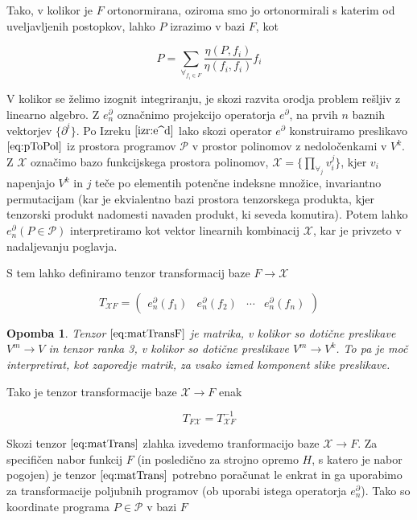 \documentclass{article}
\newcommand{\X}{\mathcal{X}}
\newcommand{\dP}{\mathcal{P}}
\newcommand{\D}{\partial}
\newtheorem{opomba}{Opomba}[section]
\begin{document}
  Tako, v kolikor je $F$ ortonormirana, oziroma smo jo ortonormirali s katerim od uveljavljenih postopkov, lahko $P$ izrazimo v bazi $F$, kot
  
  \begin{equation}
 	P=\sum\limits_{\forall_{f_i\in F}}\frac{\eta(P,f_i)}{\eta(f_i,f_i)}f_i
  \end{equation}
  
  V kolikor se želimo izognit integriranju, je skozi razvita orodja problem rešljiv z linearno algebro. Z $e_n^\D$ označnimo projekcijo operatorja $e^\D$, na prvih $n$ baznih vektorjev $\{\D^i\}$. Po Izreku $\ref{izr:e^d}$ lako skozi operator $e^\D$ konstruiramo preslikavo $\eqref{eq:pToPol}$ iz prostora programov $\dP$ v prostor polinomov z nedoločenkami v  $V^k$. Z $\X$ označimo bazo funkcijskega prostora polinomov, $\X=\{\prod\limits_{\forall_j} v_i^j\}$, kjer $v_i$ napenjajo $V^k$ in $j$ teče po elementih potenčne indeksne množice, invariantno permutacijam (kar je ekvialentno bazi prostora tenzorskega produkta, kjer tenzorski produkt nadomesti navaden produkt, ki seveda komutira). Potem lahko $e^\D_n(P\in\dP)$ interpretiramo kot vektor linearnih kombinacij $\X$, kar je privzeto v nadaljevanju poglavja.
  
  S tem lahko definiramo tenzor transformacij baze $F\to\X$
  
  \begin{equation}\label{eq:matTransF}
  T_{\X F}=\begin{pmatrix}
  e_n^\D(f_1) & e_n^\D(f_2) & \cdots & e_n^\D(f_n)
  \end{pmatrix}
  \end{equation}
  
  \begin{opomba}
  Tenzor $\eqref{eq:matTransF}$ je matrika, v kolikor so dotične preslikave $V^m\to V$ in tenzor ranka 3, v kolikor so dotične preslikave $V^m\to V^k$. To pa je moč interpretirat, kot zaporedje matrik, za vsako izmed komponent slike preslikave.
  \end{opomba}
  
  Tako je tenzor transformacije baze $\X\to F$ enak
  
  \begin{equation}\label{eq:matTrans}
  T_{F\X}=T_{\X F}^{-1}
  \end{equation}
    
  Skozi tenzor $\eqref{eq:matTrans}$ zlahka izvedemo tranformacijo baze $\X\to F$. Za specifičen nabor funkcij $F$ (in posledično za strojno opremo $H$, s katero je nabor pogojen) je tenzor $\eqref{eq:matTrans}$ potrebno poračunat le enkrat in ga uporabimo za transformacije poljubnih programov (ob uporabi istega operatorja $e^\D_n$).
  Tako so koordinate programa $P\in\dP$ v bazi $F$
  
\end{document}
